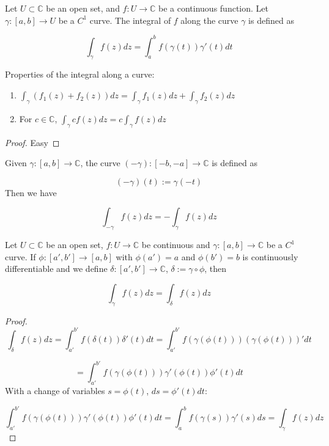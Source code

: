 \begin{definition}
	Let $U \subset \mathbb{C}$ be an open set, and $f: U \rightarrow \mathbb{C}$ be a continuous function. Let $\gamma: [a, b] \rightarrow U$ be a $C^1$ curve. The integral of $f$ along the curve $\gamma$ is defined as

	\[ \int_{\gamma} f(z) dz = \int_a^b f(\gamma(t)) \gamma'(t) dt \]
\end{definition}

\begin{corollary}
	Properties of the integral along a curve:
	\begin{enumerate}
		\item $\int_{\gamma} (f_1(z) + f_2(z)) dz = \int_{\gamma} f_1(z) dz + \int_{\gamma} f_2(z) dz$
		\item For $c \in \mathbb{C}$, $\int_{\gamma} c f(z) dz = c \int_{\gamma} f(z) dz$
	\end{enumerate}
\end{corollary}

\begin{proof}
	Easy
\end{proof}

\begin{definition}
	Given $\gamma: [a, b] \rightarrow \mathbb{C}$, the curve $(-\gamma): [-b, -a] \rightarrow \mathbb{C}$ is defined as
	
	\[ (-\gamma)(t) := \gamma(-t) \] Then we have
	
	\[ \int_{-\gamma} f(z) dz = -\int_{\gamma} f(z) dz \]
\end{definition}

\begin{lemma}
	Let $U \subset \mathbb{C}$ be an open set, $f: U \rightarrow \mathbb{C}$ be continuous and $\gamma: [a, b] \rightarrow \mathbb{C}$ be a $C^1$ curve. If $\phi: [a', b'] \rightarrow [a, b]$ with $\phi(a') = a$ and $\phi(b') = b$ is continuously differentiable and we define $\delta: [a', b'] \rightarrow \mathbb{C}$, $\delta := \gamma \circ \phi$, then

	\[ \int_{\gamma} f(z) dz = \int_{\delta} f(z) dz \]
\end{lemma}

\begin{proof}
	\[\int_{\delta} f(z) dz = \int_{a'}^{b'} f(\delta(t)) \delta'(t) dt = \int_{a'}^{b'} f(\gamma(\phi(t))) (\gamma(\phi(t)))' dt\]
	
	\[ = \int_{a'}^{b'} f(\gamma(\phi(t))) \gamma'(\phi(t)) \phi'(t) dt\]
	With a change of variables $s = \phi(t)$, $ds = \phi'(t) dt$:

	\[ \int_{a'}^{b'} f(\gamma(\phi(t))) \gamma'(\phi(t)) \phi'(t) dt = \int_a^b f(\gamma(s)) \gamma'(s) ds = \int_{\gamma} f(z) dz \]
\end{proof}

